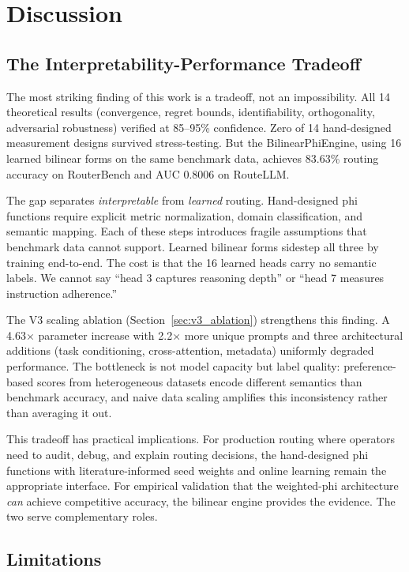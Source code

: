 \section{Discussion}
\label{sec:discussion}

\subsection{The Interpretability-Performance Tradeoff}

The most striking finding of this work is a tradeoff, not an impossibility. All 14 theoretical results (convergence, regret bounds, identifiability, orthogonality, adversarial robustness) verified at 85--95\% confidence. Zero of 14 hand-designed measurement designs survived stress-testing. But the BilinearPhiEngine, using 16 learned bilinear forms on the same benchmark data, achieves 83.63\% routing accuracy on RouterBench and AUC 0.8006 on RouteLLM.

The gap separates \emph{interpretable} from \emph{learned} routing. Hand-designed phi functions require explicit metric normalization, domain classification, and semantic mapping. Each of these steps introduces fragile assumptions that benchmark data cannot support. Learned bilinear forms sidestep all three by training end-to-end. The cost is that the 16 learned heads carry no semantic labels. We cannot say ``head 3 captures reasoning depth'' or ``head 7 measures instruction adherence.''

The V3 scaling ablation (Section~\ref{sec:v3_ablation}) strengthens this finding. A 4.63$\times$ parameter increase with 2.2$\times$ more unique prompts and three architectural additions (task conditioning, cross-attention, metadata) uniformly degraded performance. The bottleneck is not model capacity but label quality: preference-based scores from heterogeneous datasets encode different semantics than benchmark accuracy, and naive data scaling amplifies this inconsistency rather than averaging it out.

This tradeoff has practical implications. For production routing where operators need to audit, debug, and explain routing decisions, the hand-designed phi functions with literature-informed seed weights and online learning remain the appropriate interface. For empirical validation that the weighted-phi architecture \emph{can} achieve competitive accuracy, the bilinear engine provides the evidence. The two serve complementary roles.

\subsection{Limitations}

